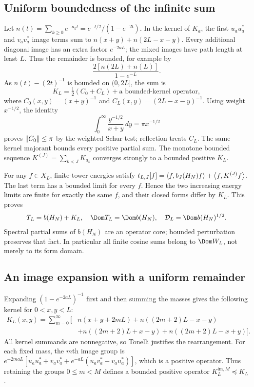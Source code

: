 \subsection{Uniform boundedness of the infinite sum}
Let $n(t)=\sum_{k\ge0}e^{-a_kt}=e^{-t/2}/(1-e^{-2t})$. In the kernel
of $K_a$, the first $u_au_a^*$ and $v_av_a^*$ image terms sum to
$n(x+y)+n(2L-x-y)$. Every additional diagonal image has an extra
factor $e^{-2aL}$; the mixed images have path length at least $L$.
Thus the remainder is bounded, for example by
\[
\frac{2[n(2L)+n(L)]}{1-e^{-L}}.
\]
As $n(t)-(2t)^{-1}$ is bounded on $(0,2L]$, the sum is
\begin{equation}\label{d:Carleman}
K_L=\tfrac12(C_0+C_L)+\text{a bounded-kernel operator},
\end{equation}
where $C_0(x,y)=(x+y)^{-1}$ and $C_L(x,y)=(2L-x-y)^{-1}$.
Using weight $x^{-1/2}$, the identity
\[
\int_0^\infty\frac{y^{-1/2}}{x+y}\,dy=\pi x^{-1/2}
\]
proves $\left\lVert C_0\right\rVert\le\pi$ by the weighted Schur test; reflection treats
$C_L$. The same kernel majorant bounds every positive partial sum.
The monotone bounded sequence $K^{(J)}=\sum_{k<J}K_{a_k}$ converges strongly
to a bounded positive $K_L$.

For any $f\in X_L$, finite-tower energies satisfy
$t_{L,J}[f]=\left\langle f,b_J(H_N)f\right\rangle+\left\langle f,K^{(J)}f\right\rangle$.
The last term has a bounded limit for every $f$. Hence the two increasing
energy limits are finite for exactly the same $f$, and their closed forms
differ by $K_L$. This proves
\begin{equation}\label{d:domains}
T_L=b(H_N)+K_L,\quad\Dom T_L=\Dom b(H_N),\quad
\mathcal D_L=\Dom b(H_N)^{1/2}.
\end{equation}
Spectral partial sums of $b(H_N)$ are an operator core; bounded perturbation
preserves that fact. In particular all finite cosine sums belong to
$\Dom W_L$, not merely to its form domain.

\subsection{An image expansion with a uniform remainder}\label{d:image-section}
Expanding $(1-e^{-2aL})^{-1}$ first and then summing the masses gives
the following kernel for $0<x,y<L$:
\begin{equation}\label{d:image-kernel}
\begin{split}
K_L(x,y)=\sum_{m=0}^{\infty}\bigl[&n(x+y+2mL)
+n((2m+2)L-x-y)\\
&+n((2m+2)L+x-y)+n((2m+2)L-x+y)\bigr].
\end{split}
\end{equation}
All kernel summands are nonnegative, so Tonelli justifies the rearrangement.
For each fixed mass, the $m$th image group is
$e^{-2maL}[u_au_a^*+v_av_a^*+e^{-aL}(u_av_a^*+v_au_a^*)]$,
which is a positive operator. Thus retaining the groups $0\le m<M$
defines a bounded positive operator $K_L^{\mathrm{im},M}\preceq K_L$.

